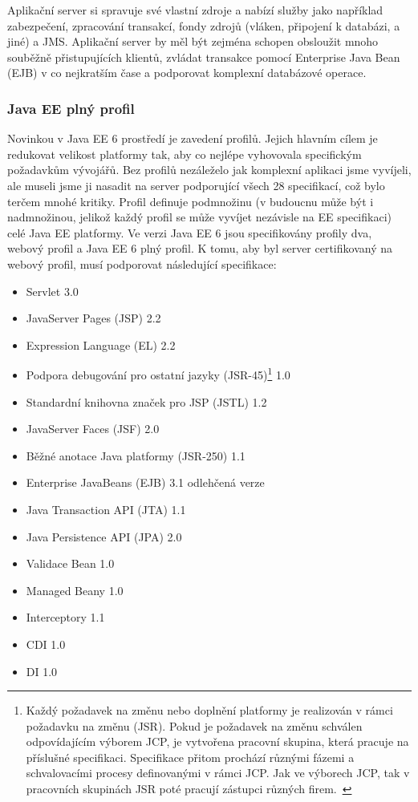 \documentclass[122pt,oneside]{fithesis}
\begin{document}
Aplikační server si spravuje své vlastní zdroje a nabízí služby jako například zabezpečení, zpracování transakcí, fondy zdrojů (vláken, připojení k databázi, a jiné) a JMS. Aplikační server by měl být zejména schopen obsloužit mnoho souběžně přistupujících klientů, zvládat transakce pomocí Enterprise Java Bean (EJB) v co nejkratším čase a podporovat komplexní databázové operace.


\subsubsection{Java EE plný profil}
\label{profily}
Novinkou v Java EE 6 prostředí je zavedení profilů. Jejich hlavním cílem je redukovat velikost platformy tak, aby co nejlépe vyhovovala specifickým požadavkům vývojářů. Bez profilů nezáleželo jak komplexní aplikaci jsme vyvíjeli, ale museli jsme ji nasadit na server podporující všech 28 specifikací, což bylo terčem mnohé kritiky. Profil definuje podmnožinu (v budoucnu může být i nadmnožinou, jelikož každý profil se může vyvíjet nezávisle na EE specifikaci) celé Java EE platformy. Ve verzi Java EE 6 jsou specifikovány profily dva, webový profil a Java EE 6 plný profil. K tomu, aby byl server certifikovaný na webový profil, musí podporovat následující specifikace:
\begin{itemize}
  \item Servlet 3.0
  \item JavaServer Pages (JSP) 2.2
  \item Expression Language (EL) 2.2
  \item Podpora debugování pro ostatní jazyky (JSR-45)\footnote{Každý požadavek na změnu nebo doplnění platformy je realizován v rámci požadavku na změnu (JSR). Pokud je požadavek na změnu schválen odpovídajícím výborem JCP, je vytvořena pracovní skupina, která pracuje na příslušné specifikaci. Specifikace přitom prochází různými fázemi a schvalovacími procesy definovanými v rámci JCP. Jak ve výborech JCP, tak v pracovních skupinách JSR poté pracují zástupci různých firem.~\cite{wikiJSR}} 1.0
  \item Standardní knihovna značek pro JSP (JSTL) 1.2
  \item JavaServer Faces (JSF) 2.0
  \item Běžné anotace Java platformy (JSR-250) 1.1
  \item Enterprise JavaBeans (EJB) 3.1 odlehčená verze
  \item Java Transaction API (JTA) 1.1
  \item Java Persistence API (JPA) 2.0
  \item Validace Bean 1.0
  \item Managed Beany 1.0
  \item Interceptory 1.1
  \item CDI 1.0
  \item DI 1.0
\end{itemize}
\end{document}
